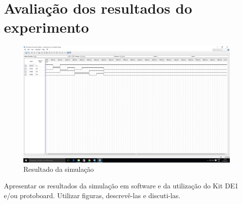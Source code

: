 \chapter{Avaliação dos resultados do experimento}


\begin{figure}[htb]
    \centering
	\caption{\label{fig:printSimulacao}Resultado da simulação}
	\includegraphics[width=1\textwidth]{img/cenario2/printSimulacao}
\end{figure}

Apresentar os resultados da simulação em software e da utilização do Kit DE1 e/ou
protoboard. Utilizar figuras, descrevê-las e discuti-las.
